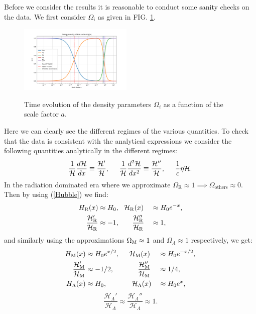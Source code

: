 \documentclass[%
reprint,
 amsmath,amssymb,
 aps,
]{revtex4-2}
\newcommand{\Hp}{\mathcal{H}}
\begin{document}
Before we consider the results it is reasonable to conduct some sanity checks on the data. We first consider $\Omega_i$ as given in FIG. \ref{Omegai}.
\begin{figure}[H]
	\caption{Time evolution of the density parameters $\Omega_i$ as a function of the scale factor $a$.}
	\includegraphics[width = 0.48\textwidth]{Figures/Omega_i.png}
	\label{Omegai}
\end{figure}
Here we can clearly see the different regimes of the various quantities. To check that the data is consistent with the analytical expressions we consider the following quantities analytically in the different regimes:
\[\frac{1}{\Hp}\frac{d\Hp}{dx}\equiv\frac{\Hp'}{\Hp},\hspace{5mm}\frac{1}{\Hp}\frac{d^2\Hp}{dx^2}\equiv\frac{\Hp''}{\Hp},\hspace{5mm}\frac{1}{c}\eta\Hp.\]
In the radiation dominated era where we approximate $\Omega_{\text{R}}\approx1\implies\Omega_\text{others}\approx0$. Then by using (\ref{Hubble}) we find:
\begin{alignat*}{2}
	H_{\text{R}}(x)&\approx H_0,~~\Hp_{\text{R}}(x)&&\approx H_0e^{-x},\\
	\frac{\Hp_{\text{R}}'}{\Hp_{\text{R}}}&\approx-1,\hspace{6.5mm}\frac{\Hp_{\text{R}}''}{\Hp_{\text{R}}}&&\approx1,
\end{alignat*}
and similarly using the approximations $\Omega_{\text M}\approx1$ and $\Omega_\Lambda\approx1$ respectively, we get:
\begin{alignat*}{2}
	H_\text{M}(x)&\approx H_0e^{x/2},\hspace{5mm}\Hp_\text M(x)&&\approx H_0e^{-x/2},\\
	\frac{\Hp_\text M'}{\Hp_\text M}&\approx-1/2,\hspace{12mm}\frac{\Hp_\text M''}{\Hp_\text M}&&\approx1/4,\\
	H_\Lambda(x)&\approx H_0,\hspace{12.5mm}\Hp_\Lambda(x)&&\approx H_0e^{x},
\end{alignat*}
\vspace{-7.2mm}
\[\frac{\Hp_\Lambda'}{\Hp_\Lambda}\approx\frac{\Hp_\Lambda''}{\Hp_\Lambda}\approx1.\]
\end{document}
